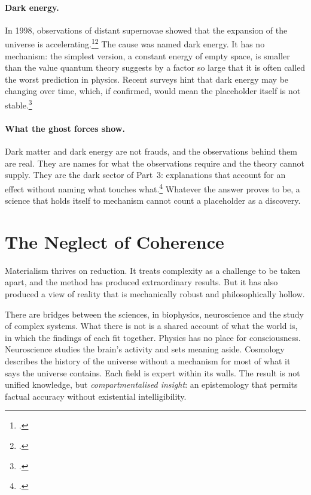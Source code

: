 \documentclass[11pt,a4paper]{article}
\newcommand{\fn}[1]{\footnote{\citealp{#1}.}}
\begin{document}
\paragraph{Dark energy.} In 1998, observations of distant supernovae showed that the expansion of the universe is accelerating.\fn{riess1998}\fn{perlmutter1999} The cause was named dark energy. It has no mechanism: the simplest version, a constant energy of empty space, is smaller than the value quantum theory suggests by a factor so large that it is often called the worst prediction in physics. Recent surveys hint that dark energy may be changing over time, which, if confirmed, would mean the placeholder itself is not stable.\fn{desi2025}

\paragraph{What the ghost forces show.} Dark matter and dark energy are not frauds, and the observations behind them are real. They are names for what the observations require and the theory cannot supply. They are the dark sector of Part~3: explanations that account for an effect without naming what touches what.\fn{rashadaPart3}  Whatever the answer proves to be, a science that holds itself to mechanism cannot count a placeholder as a discovery.

\section{The Neglect of Coherence}
\label{sec:coherence}

Materialism thrives on reduction. It treats complexity as a challenge to be taken apart, and the method has produced extraordinary results. But it has also produced a view of reality that is mechanically robust and philosophically hollow.

There are bridges between the sciences, in biophysics, neuroscience and the study of complex systems. What there is not is a shared account of what the world is, in which the findings of each fit together. Physics has no place for consciousness. Neuroscience studies the brain's activity and sets meaning aside. Cosmology describes the history of the universe without a mechanism for most of what it says the universe contains. Each field is expert within its walls. The result is not unified knowledge, but \textit{compartmentalised insight}: an epistemology that permits factual accuracy without existential intelligibility.
\end{document}
